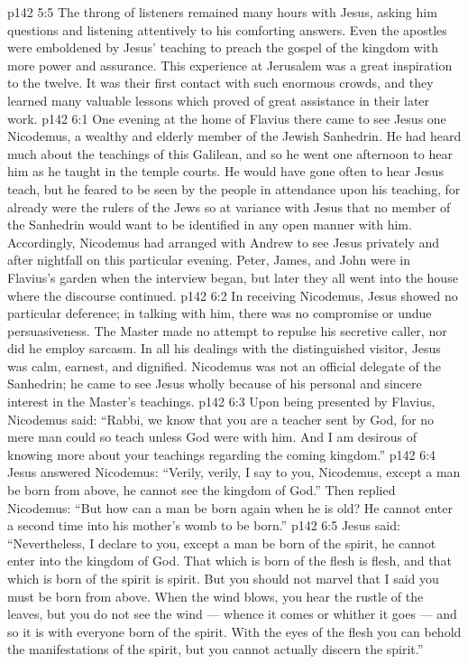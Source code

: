 \vs p142 5:5 \pc The throng of listeners remained many hours with Jesus, asking him questions and listening attentively to his comforting answers. Even the apostles were emboldened by Jesus’ teaching to preach the gospel of the kingdom with more power and assurance. This experience at Jerusalem was a great inspiration to the twelve. It was their first contact with such enormous crowds, and they learned many valuable lessons which proved of great assistance in their later work.
\vs p142 6:1 One evening at the home of Flavius there came to see Jesus one Nicodemus, a wealthy and elderly member of the Jewish Sanhedrin. He had heard much about the teachings of this Galilean, and so he went one afternoon to hear him as he taught in the temple courts. He would have gone often to hear Jesus teach, but he feared to be seen by the people in attendance upon his teaching, for already were the rulers of the Jews so at variance with Jesus that no member of the Sanhedrin would want to be identified in any open manner with him. Accordingly, Nicodemus had arranged with Andrew to see Jesus privately and after nightfall on this particular evening. Peter, James, and John were in Flavius’s garden when the interview began, but later they all went into the house where the discourse continued.
\vs p142 6:2 In receiving Nicodemus, Jesus showed no particular deference; in talking with him, there was no compromise or undue persuasiveness. The Master made no attempt to repulse his secretive caller, nor did he employ sarcasm. In all his dealings with the distinguished visitor, Jesus was calm, earnest, and dignified. Nicodemus was not an official delegate of the Sanhedrin; he came to see Jesus wholly because of his personal and sincere interest in the Master’s teachings.
\vs p142 6:3 Upon being presented by Flavius, Nicodemus said: “Rabbi, we know that you are a teacher sent by God, for no mere man could so teach unless God were with him. And I am desirous of knowing more about your teachings regarding the coming kingdom.”
\vs p142 6:4 Jesus answered Nicodemus: \textcolor{ubdarkred}{“Verily, verily, I say to you, Nicodemus, except a man be born from above, he cannot see the kingdom of God.”} Then replied Nicodemus: “But how can a man be born again when he is old? He cannot enter a second time into his mother’s womb to be born.”
\vs p142 6:5 Jesus said: \textcolor{ubdarkred}{“Nevertheless, I declare to you, except a man be born of the spirit, he cannot enter into the kingdom of God. That which is born of the flesh is flesh, and that which is born of the spirit is spirit. But you should not marvel that I said you must be born from above. When the wind blows, you hear the rustle of the leaves, but you do not see the wind --- whence it comes or whither it goes --- and so it is with everyone born of the spirit. With the eyes of the flesh you can behold the manifestations of the spirit, but you cannot actually discern the spirit.”}
